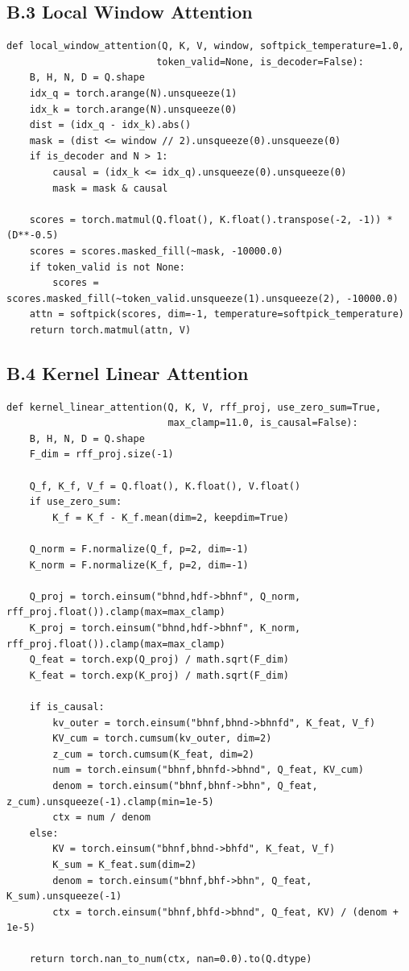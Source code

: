\subsection{B.3 Local Window Attention}

\begin{lstlisting}
def local_window_attention(Q, K, V, window, softpick_temperature=1.0, 
                          token_valid=None, is_decoder=False):
    B, H, N, D = Q.shape
    idx_q = torch.arange(N).unsqueeze(1)
    idx_k = torch.arange(N).unsqueeze(0)
    dist = (idx_q - idx_k).abs()
    mask = (dist <= window // 2).unsqueeze(0).unsqueeze(0)
    if is_decoder and N > 1:
        causal = (idx_k <= idx_q).unsqueeze(0).unsqueeze(0)
        mask = mask & causal
    
    scores = torch.matmul(Q.float(), K.float().transpose(-2, -1)) * (D**-0.5)
    scores = scores.masked_fill(~mask, -10000.0)
    if token_valid is not None:
        scores = scores.masked_fill(~token_valid.unsqueeze(1).unsqueeze(2), -10000.0)
    attn = softpick(scores, dim=-1, temperature=softpick_temperature)
    return torch.matmul(attn, V)
\end{lstlisting}

\subsection{B.4 Kernel Linear Attention}

\begin{lstlisting}
def kernel_linear_attention(Q, K, V, rff_proj, use_zero_sum=True, 
                            max_clamp=11.0, is_causal=False):
    B, H, N, D = Q.shape
    F_dim = rff_proj.size(-1)
    
    Q_f, K_f, V_f = Q.float(), K.float(), V.float()
    if use_zero_sum:
        K_f = K_f - K_f.mean(dim=2, keepdim=True)
    
    Q_norm = F.normalize(Q_f, p=2, dim=-1)
    K_norm = F.normalize(K_f, p=2, dim=-1)
    
    Q_proj = torch.einsum("bhnd,hdf->bhnf", Q_norm, rff_proj.float()).clamp(max=max_clamp)
    K_proj = torch.einsum("bhnd,hdf->bhnf", K_norm, rff_proj.float()).clamp(max=max_clamp)
    Q_feat = torch.exp(Q_proj) / math.sqrt(F_dim)
    K_feat = torch.exp(K_proj) / math.sqrt(F_dim)
    
    if is_causal:
        kv_outer = torch.einsum("bhnf,bhnd->bhnfd", K_feat, V_f)
        KV_cum = torch.cumsum(kv_outer, dim=2)
        z_cum = torch.cumsum(K_feat, dim=2)
        num = torch.einsum("bhnf,bhnfd->bhnd", Q_feat, KV_cum)
        denom = torch.einsum("bhnf,bhnf->bhn", Q_feat, z_cum).unsqueeze(-1).clamp(min=1e-5)
        ctx = num / denom
    else:
        KV = torch.einsum("bhnf,bhnd->bhfd", K_feat, V_f)
        K_sum = K_feat.sum(dim=2)
        denom = torch.einsum("bhnf,bhf->bhn", Q_feat, K_sum).unsqueeze(-1)
        ctx = torch.einsum("bhnf,bhfd->bhnd", Q_feat, KV) / (denom + 1e-5)
    
    return torch.nan_to_num(ctx, nan=0.0).to(Q.dtype)
\end{lstlisting}

